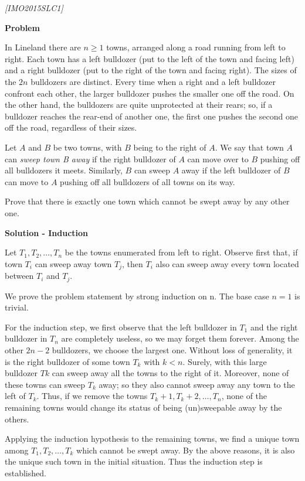 \filbreak
\begin{problem}
\textit{[IMO2015SLC1]}

\textbf{Problem}

 In Lineland there are $n \ge 1$ towns, arranged along a road running from left to right. Each town has a left bulldozer (put to the left of the town and facing left) and a right bulldozer (put to the right of the town and facing right). The sizes of the $2n$ bulldozers are distinct. Every time when a right and a left bulldozer confront each other, the larger bulldozer pushes the smaller one oﬀ the road. On the other hand, the bulldozers are quite unprotected at their rears; so, if a bulldozer reaches the rear-end of another one, the ﬁrst one pushes the second one oﬀ the road, regardless of their sizes. 
 
Let $A$ and $B$ be two towns, with $B$ being to the right of $A$. We say that town $A$ can \textit{sweep town B away} if the right bulldozer of $A$ can move over to $B$ pushing oﬀ all bulldozers it meets. Similarly, $B$ can sweep $A$ away if the left bulldozer of $B$ can move to $A$ pushing oﬀ all bulldozers of all towns on its way. 

Prove that there is exactly one town which cannot be swept away by any other one. 


\textbf{Solution - Induction}

 Let $T_1,T_2,\dots,T_n$ be the towns enumerated from left to right. Observe ﬁrst that, if town $T_i$ can sweep away town $T_j$, then $T_i$ also can sweep away every town located between $T_i$ and $T_j$. 
 
 We prove the problem statement by strong induction on n. The base case $n = 1$ is trivial. 
 
 For the induction step, we ﬁrst observe that the left bulldozer in $T_1$ and the right bulldozer in $T_n$ are completely useless, so we may forget them forever. Among the other $2n-2$ bulldozers, we choose the largest one. Without loss of generality, it is the right bulldozer of some town $T_k$ with $k < n$. Surely, with this large bulldozer $Tk$ can sweep away all the towns to the right of it. Moreover, none of these towns can sweep $T_k$ away; so they also cannot sweep away any town to the left of $T_k$. Thus, if we remove the towns $T_k+1,T_k+2,\dots,T_n$, none of the remaining towns would change its status of being (un)sweepable away by the others. 
 
 Applying the induction hypothesis to the remaining towns, we ﬁnd a unique town among $T_1,T_2,\dots,T_k$ which cannot be swept away. By the above reasons, it is also the unique such town in the initial situation. Thus the induction step is established.

\end{problem}
